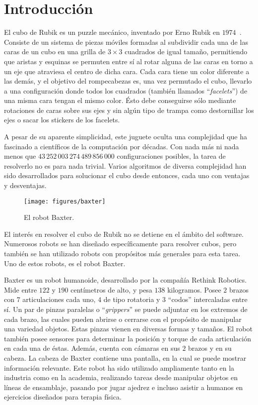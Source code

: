 \chapter{Introducción}

El cubo de Rubik es un puzzle mecánico, inventado por Erno Rubik en $1974$~\cite{ernorubik1974}. Consiste de un sistema de piezas móviles formadas al subdividir cada una de las caras de un cubo en una grilla de $3\times 3$ cuadrados de igual tamaño, permitiendo que aristas y esquinas se permuten entre sí al rotar alguna de las caras en torno a un eje que atraviesa el centro de dicha cara. Cada cara tiene un color diferente a las demás, y el objetivo del rompecabezas es, una vez permutado el cubo, llevarlo a una configuración donde todos los cuadrados (también llamados ``\emph{facelets}'') de una misma cara tengan el mismo color. Ésto debe conseguirse sólo mediante rotaciones de caras sobre sus ejes y sin algún tipo de trampa como destornillar los ejes o sacar los stickers de los facelets.

A pesar de su aparente simplicidad, este juguete oculta una complejidad que ha fascinado a científicos de la computación por décadas. Con nada más ni nada menos que $43\,252\,003\,274\,489\,856\,000$ configuraciones posibles\cite{mathematicsrubik}, la tarea de resolverlo no es para nada trivial. Varios algoritmos de diversa complejidad han sido desarrollados para solucionar el cubo desde entonces, cada uno con ventajas y desventajas.

\begin{figure}[ht]
	\centering
	\texttt{[image: figures/baxter]}
	\caption{El robot Baxter.}
	\label{baxter}
\end{figure}

El interés en resolver el cubo de Rubik no se detiene en el ámbito del software. Numerosos robots se han diseñado específicamente para resolver cubos, pero también se han utilizado robots con propósitos más generales para esta tarea. Uno de estos robots, es el robot Baxter.

Baxter es un robot humanoide, desarrollado por la compañía Rethink Robotics\cite{baxterproduct}. Mide entre $122$ y $190$ centímetros de alto, y pesa $138$ kilogramos. Posee $2$ brazos con $7$ articulaciones cada uno, $4$ de tipo rotatoria y $3$ ``codos'' intercaladas entre sí. Un par de pinzas paralelas o ``\emph{grippers}'' se puede adjuntar en los extremos de cada brazo, las cuales pueden abrirse o cerrarse con el propósito de manipular una variedad objetos. Estas pinzas vienen en diversas formas y tamaños. El robot también posee sensores para determinar la posición y torque de cada articulación en cada una de éstas. Además, cuenta con cámaras en sus $2$ brazos y en su cabeza. La cabeza de Baxter contiene una pantalla, en la cual se puede mostrar información relevante\cite{baxterspecs}.
Este robot ha sido utilizado ampliamente tanto en la industria como en la academia, realizando tareas desde manipular objetos en líneas de ensamblaje\cite{baxtersupply}, pasando por jugar ajedrez\cite{baxterchess} e incluso asistir a humanos en ejercicios diseñados para terapia física\cite{baxterassistive}.

